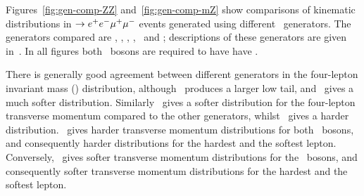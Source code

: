 
Figures~\ref{fig:gen-comp-ZZ} and~\ref{fig:gen-comp-mZ} show 
comparisons of kinematic distributions in \qqZZ
$\rightarrow e^{+}e^{-}\mu^{+}\mu^{-}$ 
events generated using different \mc\ generators. The generators compared are
\sherpa, \mcatnlo, \powhegbox, \herwig, \herwigPP\ and \pythia; descriptions of
these generators are given in~. In all figures both \Z\
bosons are required to have have \sstooos. 

There is generally good agreement between different generators in the
four-lepton invariant mass (\mZZ)
distribution, although \sherpa\ produces a larger low tail, and \mcatnlo\ gives
a much softer distribution. Similarly \mcatnlo\ gives a softer distribution
for the four-lepton transverse momentum compared to the other generators,
whilst \pythia\ gives a harder distribution. \herwig\ gives harder transverse
momentum distributions for both \Z\ bosons, and consequently harder
distributions for the hardest and the softest lepton. Conversely, \mcatnlo\ gives
softer transverse momentum distributions for the \Z\ bosons, and consequently
softer transverse momentum distributions for the hardest and the softest lepton.



